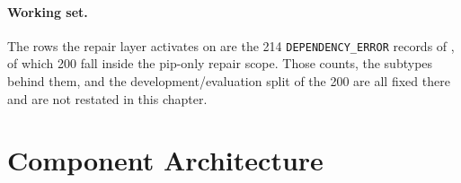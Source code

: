 \paragraph{Working set.}
The rows the repair layer activates on are the 214
\texttt{DEPENDENCY\_ERROR} records of , of which
200 fall inside the pip-only repair scope. Those counts, the subtypes
behind them, and the development/evaluation split of the 200 are all fixed
there and are not restated in this chapter.

\section{Component Architecture}
\label{sec:components}

